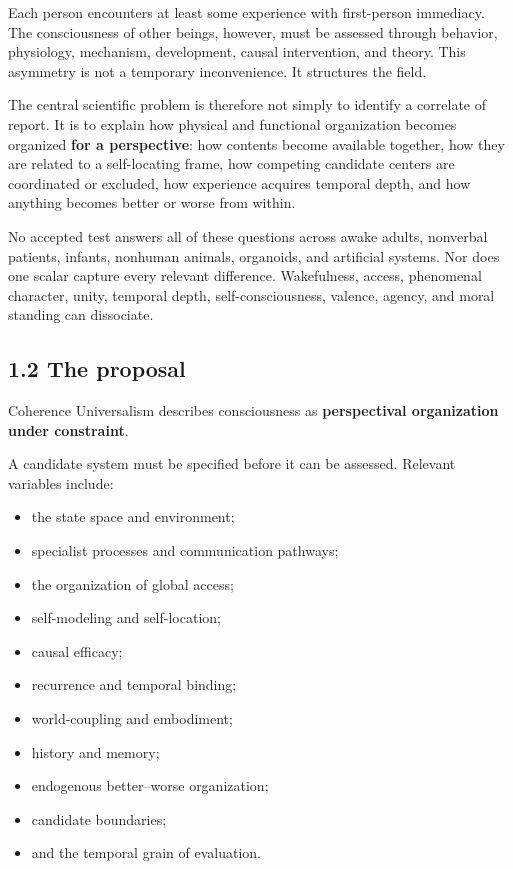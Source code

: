 \documentclass[
  11pt,
]{article}
\providecommand{\tightlist}{%
  \setlength{\itemsep}{0pt}\setlength{\parskip}{0pt}}
\begin{document}
Each person encounters at least some experience with first-person
immediacy. The consciousness of other beings, however, must be assessed
through behavior, physiology, mechanism, development, causal
intervention, and theory. This asymmetry is not a temporary
inconvenience. It structures the field.

The central scientific problem is therefore not simply to identify a
correlate of report. It is to explain how physical and functional
organization becomes organized \textbf{for a perspective}: how contents
become available together, how they are related to a self-locating
frame, how competing candidate centers are coordinated or excluded, how
experience acquires temporal depth, and how anything becomes better or
worse from within.

No accepted test answers all of these questions across awake adults,
nonverbal patients, infants, nonhuman animals, organoids, and artificial
systems. Nor does one scalar capture every relevant difference.
Wakefulness, access, phenomenal character, unity, temporal depth,
self-consciousness, valence, agency, and moral standing can dissociate.

\subsection{1.2 The proposal}\label{the-proposal}

Coherence Universalism describes consciousness as \textbf{perspectival
organization under constraint}.

A candidate system must be specified before it can be assessed. Relevant
variables include:

\begin{itemize}
\tightlist
\item
  the state space and environment;
\item
  specialist processes and communication pathways;
\item
  the organization of global access;
\item
  self-modeling and self-location;
\item
  causal efficacy;
\item
  recurrence and temporal binding;
\item
  world-coupling and embodiment;
\item
  history and memory;
\item
  endogenous better--worse organization;
\item
  candidate boundaries;
\item
  and the temporal grain of evaluation.
\end{itemize}
\end{document}
